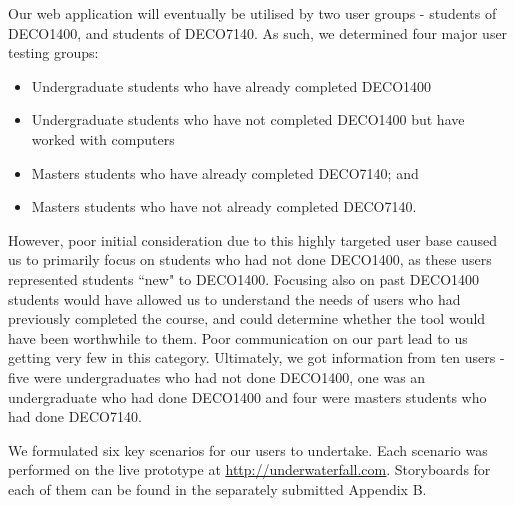 \documentclass[10pt]{article}
\begin{document}
Our web application will eventually be utilised by two user groups - students of DECO1400, and students of DECO7140. As such, we determined four major user testing groups:

\begin{itemize}
\item Undergraduate students who have already completed DECO1400
\item Undergraduate students who have not completed DECO1400 but have worked with computers
\item Masters students who have already completed DECO7140; and
\item Masters students who have not already completed DECO7140.
\end{itemize}

However, poor initial consideration due to this highly targeted user base caused us to primarily focus on students who had not done DECO1400, as these users represented students ``new" to DECO1400. Focusing also on past DECO1400 students would have allowed us to understand the needs of users who had previously completed the course, and could determine whether the tool would have been worthwhile to them. Poor communication on our part lead to us getting very few in this category. Ultimately, we got information from ten users - five were undergraduates who had not done DECO1400, one was an undergraduate who had done DECO1400 and four were masters students who had done DECO7140.

We formulated six key scenarios for our users to undertake. Each scenario was performed on the live prototype at \underline{\url{http://underwaterfall.com}}. Storyboards for each of them can be found in the separately submitted Appendix B.
\end{document}
